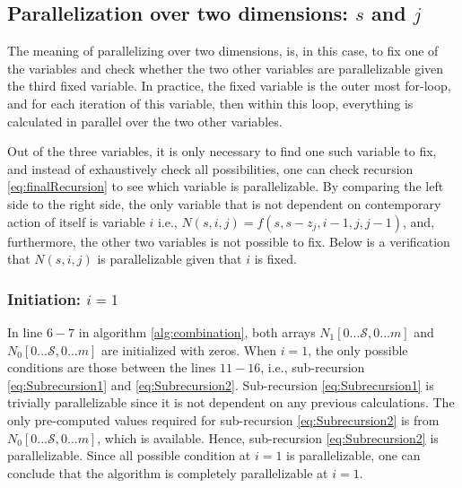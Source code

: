 \documentclass[a4paper]{article}
\begin{document}
\subsection{Parallelization over two dimensions: $s$ and $j$}
\label{sec:2Dpara}
The meaning of parallelizing over two dimensions, is, in this case, to fix one of the variables and check whether the two other variables are parallelizable given the third fixed variable. In practice, the fixed variable is the outer most for-loop, and for each iteration of this variable, then within this loop, everything is calculated in parallel over the two other variables.

Out of the three variables, it is only necessary to find one such variable to fix, and instead of exhaustively check all possibilities, one can check recursion \ref{eq:finalRecursion} to see which variable is parallelizable. By comparing the left side to the right side, the only variable that is not dependent on contemporary action of itself is variable $i$ i.e., $N(s,i,j)=f(s,s-z_{j},i-1,j,j-1)$, and, furthermore, the other two variables is not possible to fix. Below is a verification that $N(s,i,j)$ is parallelizable given that $i$ is fixed.

\newline

\subsubsection{Initiation: $i=1$}
\label{subsubsec:v2}
In line $6-7$ in algorithm \ref{alg:combination}, both arrays $N_{1}[0...\mathcal{S},0...m]$ and $N_{0}[0...\mathcal{S},0...m]$ are initialized with zeros. When $i=1$, the only possible conditions are those between the lines $11-16$, i.e., sub-recursion \ref{eq:Subrecursion1} and \ref{eq:Subrecursion2}. Sub-recursion \ref{eq:Subrecursion1} is trivially parallelizable since it is not dependent on any previous calculations. The only pre-computed values required for sub-recursion \ref{eq:Subrecursion2} is from $N_{0}[0...\mathcal{S},0...m]$, which is available. Hence, sub-recursion \ref{eq:Subrecursion2} is parallelizable. Since all possible condition at $i=1$ is parallelizable, one can conclude that the algorithm is completely parallelizable at $i=1$.
\end{document}
